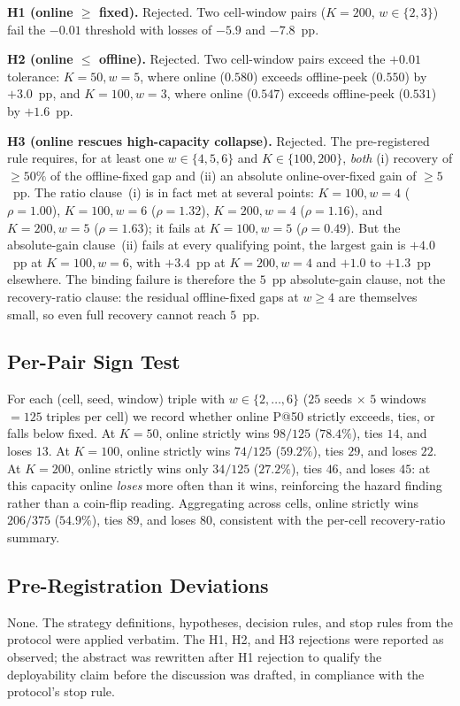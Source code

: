 

\textbf{H1 (online $\geq$ fixed).} Rejected. Two cell-window pairs
($K=200$, $w \in \{2, 3\}$) fail the $-0.01$ threshold with losses of
$-5.9$ and $-7.8$~pp.

\textbf{H2 (online $\leq$ offline).} Rejected. Two cell-window pairs
exceed the $+0.01$ tolerance: $K = 50, w = 5$, where online ($0.580$)
exceeds offline-peek ($0.550$) by $+3.0$~pp, and $K = 100, w = 3$,
where online ($0.547$) exceeds offline-peek ($0.531$) by $+1.6$~pp.

\textbf{H3 (online rescues high-capacity collapse).} Rejected. The
pre-registered rule requires, for at least one $w \in \{4, 5, 6\}$
and $K \in \{100, 200\}$, \textit{both} (i) recovery of $\geq 50\%$
of the offline-fixed gap and (ii) an absolute online-over-fixed gain
of $\geq 5$~pp. The ratio clause~(i) is in fact met at several
points: $K = 100, w = 4$ ($\rho = 1.00$), $K = 100, w = 6$
($\rho = 1.32$), $K = 200, w = 4$ ($\rho = 1.16$), and
$K = 200, w = 5$ ($\rho = 1.63$); it fails at
$K = 100, w = 5$ ($\rho = 0.49$). But the absolute-gain clause~(ii)
fails at every qualifying point, the largest gain is $+4.0$~pp at
$K = 100, w = 6$, with $+3.4$~pp at $K = 200, w = 4$ and $+1.0$ to
$+1.3$~pp elsewhere. The binding failure is therefore the $5$~pp
absolute-gain clause, not the recovery-ratio clause: the residual
offline-fixed gaps at $w \geq 4$ are themselves small, so even full
recovery cannot reach $5$~pp.

\subsection{Per-Pair Sign Test}

For each (cell, seed, window) triple with $w \in \{2, \ldots, 6\}$
($25$ seeds $\times$ $5$ windows $= 125$ triples per cell) we record
whether online P@50 strictly exceeds, ties, or falls below fixed.
At $K = 50$, online strictly wins $98/125$ ($78.4\%$), ties $14$,
and loses $13$. At $K = 100$, online strictly wins $74/125$
($59.2\%$), ties $29$, and loses $22$. At $K = 200$, online strictly
wins only $34/125$ ($27.2\%$), ties $46$, and loses $45$: at this
capacity online \textit{loses} more often than it wins, reinforcing
the hazard finding rather than a coin-flip reading. Aggregating
across cells, online strictly wins $206/375$ ($54.9\%$), ties $89$,
and loses $80$, consistent with the per-cell recovery-ratio summary.

\subsection{Pre-Registration Deviations}

None. The strategy definitions, hypotheses, decision rules, and stop
rules from the protocol were applied verbatim. The H1, H2, and H3
rejections were reported as observed; the abstract was rewritten
after H1 rejection to qualify the deployability claim before the
discussion was drafted, in compliance with the protocol's stop rule.
